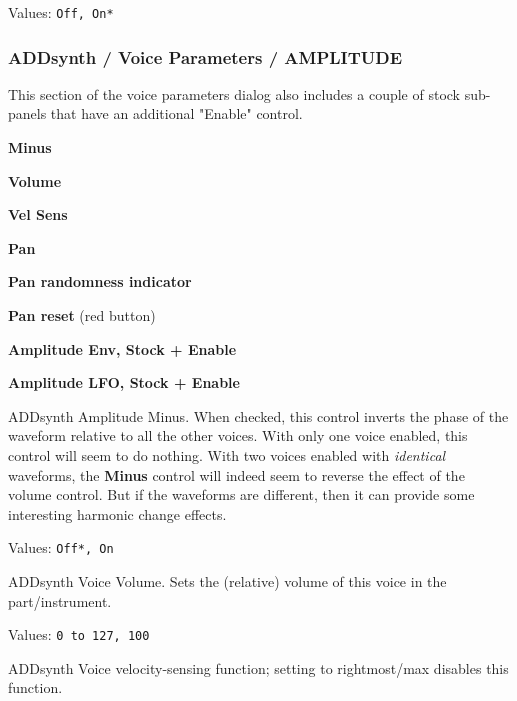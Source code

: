    Values: \texttt{Off, On*}

\subsubsection{ADDsynth / Voice Parameters / AMPLITUDE}
\label{subsubsec:addsynth_voice_parameters_amplitude}

   This section of the voice parameters dialog also includes a couple of
   stock sub-panels that have an additional "Enable" control.

   \begin{enumber}
      \item \textbf{Minus}
      \item \textbf{Volume}
      \item \textbf{Vel Sens}
      \item \textbf{Pan}
      \item \textbf{Pan randomness indicator}
      \item \textbf{Pan reset} (red button)
      \item \textbf{Amplitude Env, Stock + Enable}
      \item \textbf{Amplitude LFO, Stock + Enable}
   \end{enumber}

   \setcounter{ItemCounter}{0}      %

   ADDsynth Amplitude Minus.
   When checked, this control inverts the phase of the waveform relative to all
   the other voices.
   With only one voice enabled, this control will seem to do nothing.
   With two voices enabled with \textsl{identical} waveforms, the
   \textbf{Minus} control will indeed seem to reverse the effect of the volume
   control. But if the waveforms are different, then it can provide some
   interesting harmonic change effects.

   Values: \texttt{Off*, On}

   ADDsynth Voice Volume.
   Sets the (relative) volume of this voice in the part/instrument.

   Values: \texttt{0 to 127, 100}

   ADDsynth Voice velocity-sensing function; setting to rightmost/max
   disables this function.

